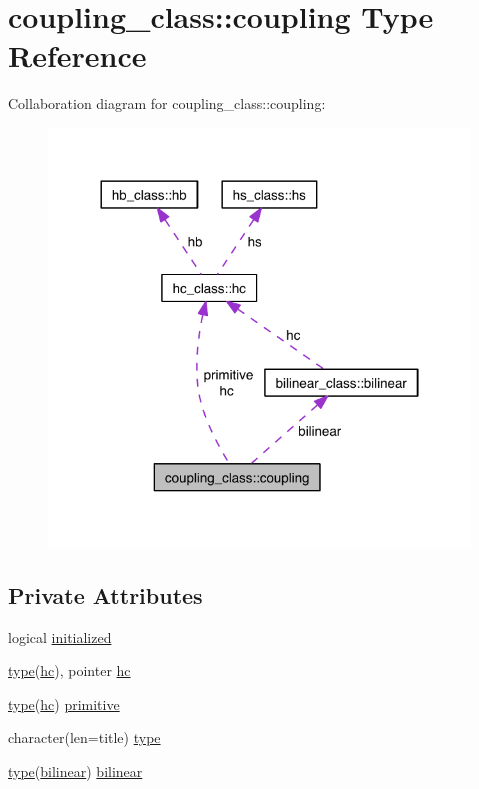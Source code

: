 \hypertarget{structcoupling__class_1_1coupling}{}\section{coupling\+\_\+class\+:\+:coupling Type Reference}
\label{structcoupling__class_1_1coupling}


Collaboration diagram for coupling\+\_\+class\+:\+:coupling\+:\nopagebreak
\begin{figure}[H]
\begin{center}
\leavevmode
\includegraphics[width=317pt]{structcoupling__class_1_1coupling__coll__graph}
\end{center}
\end{figure}
\subsection*{Private Attributes}
\begin{DoxyCompactItemize}
\item 
logical \hyperlink{structcoupling__class_1_1coupling_affedc100d4678792285e848dd4deb313}{initialized}
\item 
\hyperlink{structcoupling__class_1_1coupling_a74b13fd447f07c24380e3913fd06d545}{type}(\hyperlink{structhc__class_1_1hc}{hc}), pointer \hyperlink{structcoupling__class_1_1coupling_a2592edb5bbaf558a6196d78782c17ac2}{hc}
\item 
\hyperlink{structcoupling__class_1_1coupling_a74b13fd447f07c24380e3913fd06d545}{type}(\hyperlink{structhc__class_1_1hc}{hc}) \hyperlink{structcoupling__class_1_1coupling_a330aec84b5697ea890627c9a10562fb5}{primitive}
\item 
character(len=title) \hyperlink{structcoupling__class_1_1coupling_a74b13fd447f07c24380e3913fd06d545}{type}
\item 
\hyperlink{structcoupling__class_1_1coupling_a74b13fd447f07c24380e3913fd06d545}{type}(\hyperlink{structbilinear__class_1_1bilinear}{bilinear}) \hyperlink{structcoupling__class_1_1coupling_a64232ba94787370a17c636014e966d13}{bilinear}
\end{DoxyCompactItemize}


